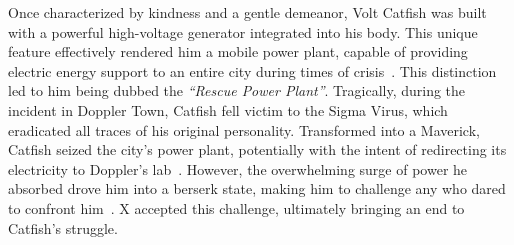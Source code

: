 Once characterized by kindness and a gentle demeanor, Volt Catfish was built with a powerful high-voltage generator integrated into his body. This unique feature effectively rendered him a mobile power plant, capable of providing electric energy support to an entire city during times of crisis~\cite{wayback:X3_resources}. This distinction led to him being dubbed the \textit{``Rescue Power Plant''}. Tragically, during the incident in Doppler Town, Catfish fell victim to the Sigma Virus, which eradicated all traces of his original personality. Transformed into a Maverick, Catfish seized the city's power plant, potentially with the intent of redirecting its electricity to Doppler's lab~\cite{wiki:Volt_catfish}. However, the overwhelming surge of power he absorbed drove him into a berserk state, making him to challenge any who dared to confront him~\cite{Xcoll1:Manual_X3}. X accepted this challenge, ultimately bringing an end to Catfish's struggle.

